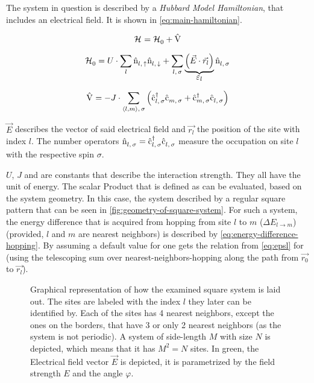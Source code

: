 The system in question is described by a \emph{Hubbard Model Hamiltonian}, that includes an electrical field. It is shown in \autoref{eq:main-hamiltonian}.


\begin{equation}
    \label{eq:main-hamiltonian}
    \pictureHamiltonian = \HzeroHamiltonian + \Vhamiltonian
\end{equation}

\begin{equation}
    \label{eq:main-hamiltonian-h0}
    \HzeroHamiltonian = U \cdot \lsum \nop{l}{\up}\nop{l}{\down} + \lsum[l,\,\sigma] \underbrace{\left(\vec{E} \cdot \vec{r_l}\right)}_{\text{\normalsize \epsl}} \nop{l}{\sigma}
\end{equation}

\begin{equation}
    \label{eq:main-hamiltonian-pertubation}
    \Vhamiltonian =  - J \cdot \neighborsumWSpin{l}{m}{\sigma} \left(\withspinop{l}{\sigma}{\dagger} \withspinop{m}{\sigma}{} + \withspinop{m}{\sigma}{\dagger} \withspinop{l}{\sigma}{} \right)
\end{equation}

$\vec{E}$ describes the vector of said electrical field and $\vec{r_l}$ the position of the site with index $l$.
The number operators $\hat{\text{n}}^{ }_{l,\,\sigma} = \hat{\text{c}}^{\dagger }_{l,\,\sigma}\hat{\text{c}}^{ }_{l,\,\sigma}$ measure the occupation on site $l$ with the respective spin $\sigma$. 

$U$, $J$ and \epsl[] are constants that describe the interaction strength. 
They all have the unit of energy. 
The scalar Product that is defined as \epsl[] can be evaluated, based on the system geometry. 
In this case, the system described by a regular square pattern that can be seen in \autoref{fig:geometry-of-square-system}. 
For such a system, the energy difference that is acquired from hopping from site $l$ to $m$ ($\Delta E_{l \rightarrow m}$) (provided, $l$ and $m$ are nearest neighbors) is described by \autoref{eq:energy-difference-hopping}. By assuming a default value for \epsl[0] one gets the relation from \autoref{eq:epsl} for \epsl{} (using the telescoping sum over nearest-neighbors-hopping along the path from $\vec{r_0}$ to $\vec{r_l}$). 

\begin{figure}[htbp]
    \centering
            
    \vspace{0.8cm}
    \caption{Graphical representation of how the examined square system is laid out. The sites are labeled with the index $l$ they later can be identified by. Each of the sites has 4 nearest neighbors, except the ones on the borders, that have 3 or only 2 nearest neighbors (as the system is not periodic). A system of side-length $M$ with size $N$ is depicted, which means that it has $M^2 = N$ sites.
    In green, the Electrical field vector $\vec{E}$ is depicted, it is parametrized by the field strength $E$ and the angle $\varphi$.}
    \label{fig:geometry-of-square-system}
\end{figure}

